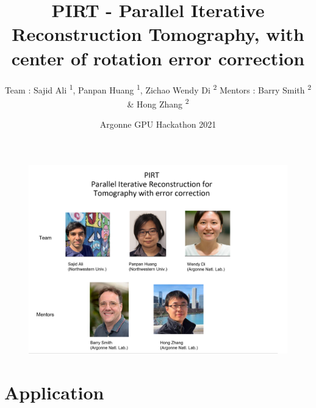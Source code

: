\documentclass{beamer}
\title{PIRT - Parallel Iterative Reconstruction Tomography, with center of rotation error correction}
\author{Team : Sajid Ali \textsuperscript{1}, Panpan Huang \textsuperscript{1}, Zichao Wendy Di \textsuperscript{2} \newline \newline Mentors : Barry Smith \textsuperscript{2} \& Hong Zhang \textsuperscript{2} }
\institute[shortinst]{\textsuperscript{1} Northwestern University \and \inst{2} Argonne National Laboratory}
\date{Argonne GPU Hackathon 2021}
\begin{document}

\begin{frame}
\begin{center}
	\begin{figure}
		\includegraphics[scale=0.25]{figures/pirt}
	\end{figure}
\end{center}
\end{frame}


\section{Application}
\end{document}
